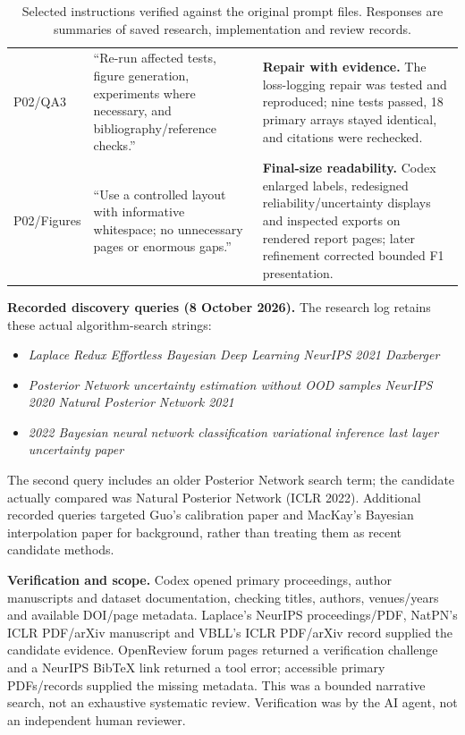 \documentclass[10pt,a4paper]{article}
\begin{document}
\begin{table}[H]
\begin{tabularx}{\linewidth}{>{\raggedright\arraybackslash}p{19mm}>{\raggedright\arraybackslash}p{67mm}>{\raggedright\arraybackslash}X}
P02/QA3 & ``Re-run affected tests, figure generation, experiments where necessary, and bibliography/reference checks.'' & \textbf{Repair with evidence.} The loss-logging repair was tested and reproduced; nine tests passed, 18 primary arrays stayed identical, and citations were rechecked. \\
P02/Figures & ``Use a controlled layout with informative whitespace; no unnecessary pages or enormous gaps.'' & \textbf{Final-size readability.} Codex enlarged labels, redesigned reliability/uncertainty displays and inspected exports on rendered report pages; later refinement corrected bounded F1 presentation. \\
\bottomrule
\end{tabularx}
\caption{Selected instructions verified against the original prompt files.
Responses are summaries of saved research, implementation and review records.}
\end{table}

\textbf{Recorded discovery queries (8 October 2026).}
The research log retains these actual algorithm-search strings:
\begin{itemize}[leftmargin=12pt,itemsep=1pt,topsep=2pt]
\item \emph{Laplace Redux Effortless Bayesian Deep Learning NeurIPS 2021 Daxberger}
\item \emph{Posterior Network uncertainty estimation without OOD samples NeurIPS 2020 Natural Posterior Network 2021}
\item \emph{2022 Bayesian neural network classification variational inference last layer uncertainty paper}
\end{itemize}
The second query includes an older Posterior Network search term; the candidate
actually compared was Natural Posterior Network (ICLR 2022). Additional recorded
queries targeted Guo's calibration paper and MacKay's Bayesian interpolation
paper for background, rather than treating them as recent candidate methods.

\textbf{Verification and scope.}
Codex opened primary proceedings, author manuscripts and dataset documentation,
checking titles, authors, venues/years and available DOI/page metadata.
Laplace's NeurIPS proceedings/PDF, NatPN's ICLR PDF/arXiv manuscript and VBLL's
ICLR PDF/arXiv record supplied the candidate evidence. OpenReview forum pages
returned a verification challenge and a NeurIPS BibTeX link returned a tool
error; accessible primary PDFs/records supplied the missing metadata.
This was a bounded narrative search, not an exhaustive systematic review.
Verification was by the AI agent, not an independent human reviewer.
\clearpage
\end{document}
